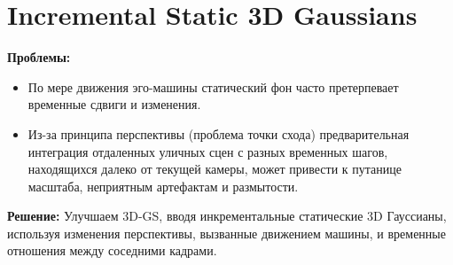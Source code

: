 \section{Incremental Static 3D Gaussians}
\textbf{Проблемы:}
\begin{itemize}
    \item По мере движения эго-машины статический фон часто претерпевает временные сдвиги и изменения.
    \item Из-за принципа перспективы (проблема точки схода) предварительная интеграция отдаленных уличных сцен с разных временных шагов, находящихся далеко от текущей камеры, может привести к путанице масштаба, неприятным артефактам и размытости.
\end{itemize}
\textbf{Решение:}
Улучшаем 3D-GS, вводя инкрементальные статические 3D Гауссианы, используя изменения перспективы, вызванные движением машины, и временные отношения между соседними кадрами.
